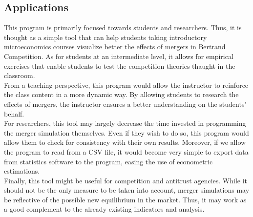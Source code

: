 \documentclass[12pt]{article}
\begin{document}
\subsection{Applications}
This program is primarily focused towards students and researchers. Thus, it is thought as a simple tool that can help students taking introductory microeconomics courses visualize better the effects of mergers in Bertrand Competition. As for students at an intermediate level, it allows for empirical exercises that enable students to test the competition theories thaught in the classroom.\\
From a teaching perspective, this program would allow the instructor to reinforce the class content in a more dynamic way. By allowing students to research the effects of mergers, the instructor ensures a better understanding on the students' behalf.\\
For researchers, this tool may largely decrease the time invested in programming the merger simulation themselves. Even if they wish to do so, this program would allow them to check for consistency with their own results. Moreover, if we allow the program to read from a CSV file, it would become very simple to export data from statistics software to the program, easing the use of econometric estimations.\\
Finally, this tool might be useful for competition and antitrust agencies. While it should not be the only measure to be taken into account, merger simulations may be reflective of the possible new equilibrium in the market. Thus, it may work as a good complement to the already existing indicators and analysis.
\end{document}
